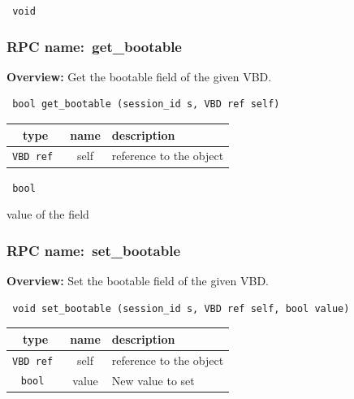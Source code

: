 \vspace{0.3cm}

{\tt 
void
}



\vspace{0.3cm}
\vspace{0.3cm}
\vspace{0.3cm}
\subsubsection{RPC name:~get\_bootable}

{\bf Overview:} 
Get the bootable field of the given VBD.

\begin{verbatim} bool get_bootable (session_id s, VBD ref self)\end{verbatim}



 
\vspace{0.3cm}
\begin{tabular}{|c|c|p{7cm}|}
 \hline
{\bf type} & {\bf name} & {\bf description} \\ \hline
{\tt VBD ref } & self & reference to the object \\ \hline 

\end{tabular}

\vspace{0.3cm}

{\tt 
bool
}


value of the field
\vspace{0.3cm}
\vspace{0.3cm}
\vspace{0.3cm}
\subsubsection{RPC name:~set\_bootable}

{\bf Overview:} 
Set the bootable field of the given VBD.

\begin{verbatim} void set_bootable (session_id s, VBD ref self, bool value)\end{verbatim}



 
\vspace{0.3cm}
\begin{tabular}{|c|c|p{7cm}|}
 \hline
{\bf type} & {\bf name} & {\bf description} \\ \hline
{\tt VBD ref } & self & reference to the object \\ \hline 

{\tt bool } & value & New value to set \\ \hline 

\end{tabular}


